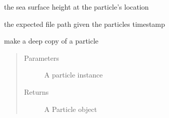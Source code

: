 \documentclass[letterpaper,10pt,english]{sphinxmanual}
\begin{document}
\begin{fulllineitems}
\begin{fulllineitems}
\end{fulllineitems}


\begin{fulllineitems}
\label{\detokenize{octapy:octapy.tracking.Particle.ssh}}
\sphinxAtStartPar
the sea surface height at the particle’s location

\end{fulllineitems}


\begin{fulllineitems}
\label{\detokenize{octapy:octapy.tracking.Particle.filepath}}
\sphinxAtStartPar
the expected file path given the particles timestamp

\end{fulllineitems}


\end{fulllineitems}


\begin{fulllineitems}
\label{\detokenize{octapy:octapy.tracking.deepcopy}}
\sphinxAtStartPar
make a deep copy of a particle
\begin{quote}\begin{description}
\item[{Parameters}] \leavevmode
\sphinxAtStartPar
{} \textendash{} A particle instance

\item[{Returns}] \leavevmode
\sphinxAtStartPar
A Particle object

\end{description}\end{quote}

\end{fulllineitems}

\end{document}
